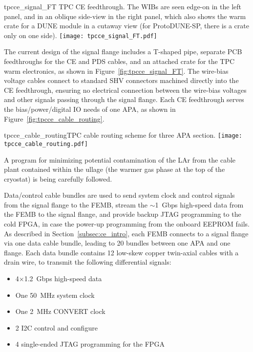 \begin{cdrfigure}{tpcce_signal_FT}{
TPC CE feedthrough. The WIBs are seen edge-on in the left panel,
and in an oblique side-view in the right panel, which also shows the warm crate for a DUNE module in a cutaway view (for 
ProtoDUNE-SP, there is a crate only on one side).}
\texttt{[image: tpcce\_signal\_FT.pdf]}
\end{cdrfigure}

The current design of the signal flange includes a T-shaped pipe, separate PCB feedthroughs for the CE and PDS cables, and
an attached crate for the TPC warm electronics, as shown in Figure~\ref{fig:tpcce_signal_FT}.
The wire-bias voltage cables connect to standard SHV connectors machined directly into the CE feedthrough,
ensuring no electrical connection between the wire-bias voltages and other signals passing through the signal flange.
Each CE feedthrough serves the bias/power/digital IO needs of one APA, as shown 
in Figure~\ref{fig:tpcce_cable_routing}.  

\begin{cdrfigure}{tpcce_cable_routing}{TPC cable routing scheme for three APA section.}
\texttt{[image: tpcce\_cable\_routing.pdf]}
\end{cdrfigure}

A program for minimizing potential contamination of the LAr from the cable plant contained within the ullage
(the warmer gas phase at the top of the cryostat) 
is being carefully followed.


Data/control cable bundles are used to send system clock and control signals from the 
signal flange to the FEMB, stream the $\sim$1~Gbps high-speed data from the FEMB to the signal flange, and 
provide backup JTAG programming to the cold FPGA, in case the power-up programming from the onboard 
EEPROM fails. As described in Section~\ref{subsec:ce_intro}, each FEMB 
connects to a signal flange via one data cable bundle, leading to 20 bundles between one APA and one flange.
Each data bundle contains 12 low-skew copper twin-axial cables with a drain wire, 
to transmit the following differential signals:

\begin{itemize}
    \item 4$\times$1.2~Gbps high-speed data
    \item One 50~MHz system clock
    \item One 2~MHz CONVERT clock
    \item 2 I2C control and configure
    \item 4 single-ended JTAG programming for the FPGA
\end{itemize}

